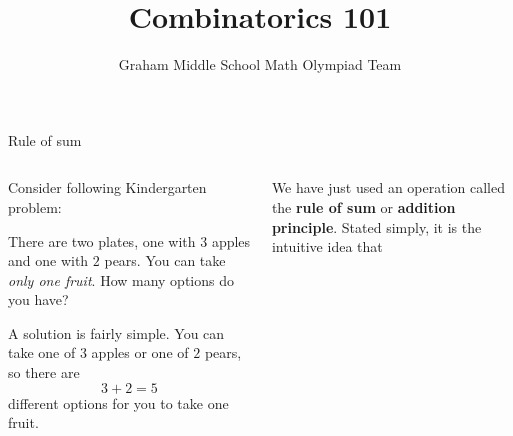 \documentclass[9pt,aspectratio=169]{beamer}
\title{Combinatorics 101}
\subtitle[Graham Middle School]{Graham Middle School Math Olympiad Team}
\begin{document}
\maketitle

\begin{frame}{Rule of sum}
  \begin{columns}[T]
    \begin{column}{0.5\textwidth}
      Consider following Kindergarten problem:

      \begin{problem}{}
        There are two plates, one with $3$ apples and one with $2$ pears. You can take \emph{only one fruit}. How many options do you have?
      \end{problem}
  
      \begin{nscenter}
      \end{nscenter}

      A solution is fairly simple. You can take one of $3$ apples or one of $2$ pears, so there are
      \[ 3 + 2 = 5 \]
      different options for you to take one fruit.
    \end{column}
    \begin{column}{0.5\textwidth}
      We have just used an operation called the \textbf{rule of sum} or \textbf{addition principle}. Stated simply, it is the intuitive idea that 


\end{column}
\end{columns}
\end{frame}
\end{document}
